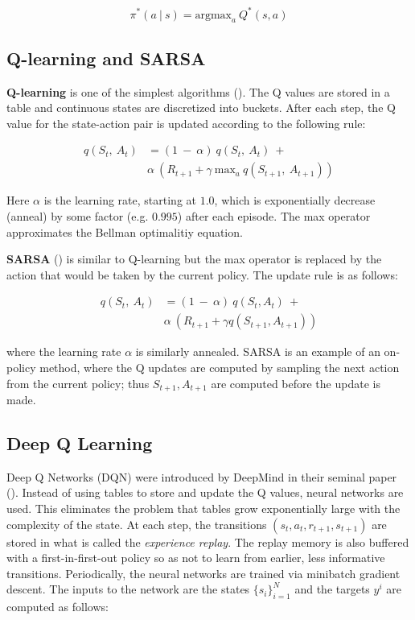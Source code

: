 \documentclass{article}
\newcommand{\citep}[2][]{(\cite[#1]{#2})}
\begin{document}
\begin{equation}
    \pi^*(a\ |\ s) = \text{argmax}_a\ Q^*(s, a)
\end{equation}

\subsection{Q-learning and SARSA}
\textbf{Q-learning} is one of the simplest algorithms \citep{sutton_learning_1988}. The Q values are stored in a table and continuous states are discretized into buckets. After each step, the Q value for the state-action pair is updated according to the following rule:

\begin{equation}
    \begin{split}
        q(S_t, \ A_t) &= (1\ -\ \alpha)\ q(S_t,\ A_t)\ +\\
            &\alpha\ (R_{t + 1} + \gamma\ \text{max}_a\ q(S_{t+1},\ A_{t + 1}))
    \end{split}
\end{equation}

Here $\alpha$ is the learning rate, starting at $1.0$, which is exponentially decrease (anneal) by some factor (e.g. $0.995$) after each episode. The max operator approximates the Bellman optimalitiy equation.

\textbf{SARSA} \citep{a._rummery_-line_1994} is similar to Q-learning but the max operator is replaced by the action that would be taken by the current policy. The update rule is as follows:

\begin{equation}
    \begin{split}
        q(S_t,\ A_t) &= (1\ -\ \alpha)\ q(S_t, A_t)\ + \\
            &\alpha\ (R_{t+1} + \gamma q(S_{t+1}, A_{t+1}))
    \end{split}
\end{equation}

where the learning rate $\alpha$ is similarly annealed. SARSA is an example of an on-policy method, where the Q updates are computed by sampling the next action from the current policy; thus $S_{t+1}, A_{t+1}$ are computed before the update is made.

\subsection{Deep Q Learning}
Deep Q Networks (DQN) were introduced by DeepMind in their seminal paper \citep{mnih_human-level_2015}. Instead of using tables to store and update the Q values, neural networks are used. This eliminates the problem that  tables grow exponentially large with the complexity of the state. At each step, the transitions $(s_t, a_t, r_{t+1}, s_{t+1})$ are stored in what is called the \textit{experience replay}. The replay memory is also buffered with a first-in-first-out policy so as not to learn from earlier, less informative transitions. Periodically, the neural networks are trained via minibatch gradient descent. The inputs to the network are the states $\{ s_i \}_{i = 1}^N$ and the targets $y^i$ are computed as follows:
\end{document}

